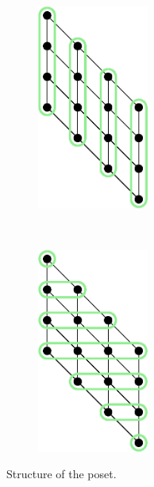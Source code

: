 \begin{figure}
\centering
\begin{subfigure}[t]{0.47\textwidth}
\centering
	\includegraphics[width=0.4\textwidth]{fig/x+y/poset/chains}
	\label{fig:xy:poset:chains}
\end{subfigure}
~
\begin{subfigure}[t]{0.47\textwidth}
\centering
	\includegraphics[width=0.4\textwidth]{fig/x+y/poset/antichains}
	\label{fig:xy:poset:antichains}
\end{subfigure}
\caption{Structure of the \XY poset.}
\label{fig:xy:poset:diagrams}
\end{figure}

